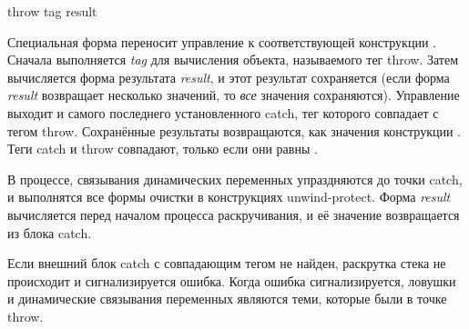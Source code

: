 \begin{defspec}
throw tag result

Специальная форма  переносит управление к соответствующей конструкции
.
Сначала выполняется \emph{tag} для вычисления объекта, называемого тег
throw. Затем вычисляется форма результата \emph{result}, и этот результат
сохраняется (если форма \emph{result} возвращает несколько значений, то
\emph{все} значения сохраняются).
Управление выходит и самого последнего установленного catch, тег которого
совпадает с тегом throw. Сохранённые результаты возвращаются, как значения
конструкции .
Теги catch и throw совпадают, только если они равны .

В процессе, связывания динамических переменных упраздняются до точки catch, и
выполнятся все формы очистки в конструкциях unwind-protect.
Форма \emph{result} вычисляется перед началом процесса раскручивания, и её
значение возвращается из блока catch.

Если внешний блок catch с совпадающим тегом не найден, раскрутка стека не
происходит и сигнализируется ошибка.
Когда ошибка сигнализируется, ловушки и динамические связывания переменных
являются теми, которые были в точке throw.
\end{defspec}

\fi